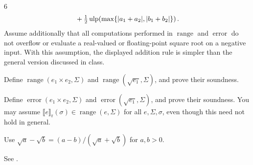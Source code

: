 \documentclass[11pt,oneside]{article}
\begin{document}
\begin{problem}{6}
\[\begin{aligned}
  &\quad+\tfrac12\operatorname{ulp}\!\left(\max\{|a_1+a_2|, |b_1+b_2|\}\right).
\end{aligned}
\]
Assume additionally that all computations performed in
$\operatorname{range}$ and $\operatorname{error}$ do not overflow
or evaluate a real-valued or floating-point square root on a
negative input. With this assumption, the displayed addition rule
is simpler than the general version discussed in class.
\begin{problemsubparts}
\item Define $\operatorname{range}(e_1\times e_2, \Sigma)$ and
$\operatorname{range}(\sqrt{e_1}, \Sigma)$, and prove their soundness.
\item Define $\operatorname{error}(e_1\times e_2, \Sigma)$ and
$\operatorname{error}(\sqrt{e_1}, \Sigma)$, and prove their soundness.
You may assume $\llbracket e\rrbracket_{\mathrm r}(\sigma)
\in\operatorname{range}(e, \Sigma)$ for all $e, \Sigma, \sigma$,
even though this need not hold in general.
\begin{hint}
Use $\sqrt a-\sqrt b=(a-b)/(\sqrt a+\sqrt b)$ for $a, b>0$.
\end{hint}
\item See .
\end{problemsubparts}
\end{problem}
\end{document}
